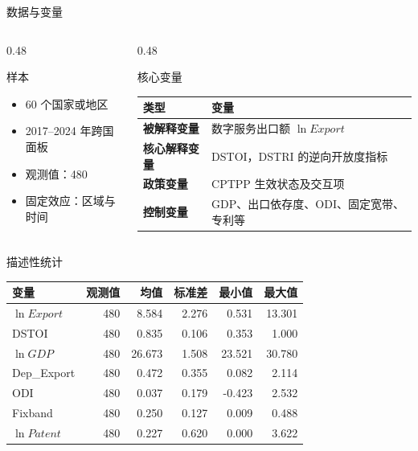 \documentclass[aspectratio=169,10pt]{ctexbeamer}
\newcommand{\smallnote}[1]{\vspace{0.25em}{\scriptsize\color{gray}#1}}
\begin{document}
\begin{frame}{数据与变量}
  \begin{columns}[T,totalwidth=\textwidth]
    \begin{column}{0.48\textwidth}
      \begin{block}{样本}
        \begin{itemize}
          \item 60 个国家或地区
          \item 2017--2024 年跨国面板
          \item 观测值：480
          \item 固定效应：区域与时间
        \end{itemize}
      \end{block}
    \end{column}
    \begin{column}{0.48\textwidth}
      \begin{block}{核心变量}
        \begin{tabularx}{\linewidth}{>{\bfseries}lX}
          \toprule
          类型 & 变量 \\
          \midrule
          被解释变量 & 数字服务出口额 $\ln Export$ \\
          核心解释变量 & DSTOI，DSTRI 的逆向开放度指标 \\
          政策变量 & CPTPP 生效状态及交互项 \\
          控制变量 & GDP、出口依存度、ODI、固定宽带、专利等 \\
          \bottomrule
        \end{tabularx}
      \end{block}
    \end{column}
  \end{columns}
\end{frame}

\begin{frame}{描述性统计}
  \begin{table}
  \centering
  \small
  \begin{tabular}{lrrrrr}
    \toprule
    变量 & 观测值 & 均值 & 标准差 & 最小值 & 最大值 \\
    \midrule
    $\ln Export$ & 480 & 8.584 & 2.276 & 0.531 & 13.301 \\
    DSTOI & 480 & 0.835 & 0.106 & 0.353 & 1.000 \\
    $\ln GDP$ & 480 & 26.673 & 1.508 & 23.521 & 30.780 \\
    Dep\_Export & 480 & 0.472 & 0.355 & 0.082 & 2.114 \\
    ODI & 480 & 0.037 & 0.179 & -0.423 & 2.532 \\
    Fixband & 480 & 0.250 & 0.127 & 0.009 & 0.488 \\
    $\ln Patent$ & 480 & 0.227 & 0.620 & 0.000 & 3.622 \\
    \bottomrule
  \end{tabular}
  \end{table}
  \smallnote{资料来源：论文表1。}
\end{frame}
\end{document}
